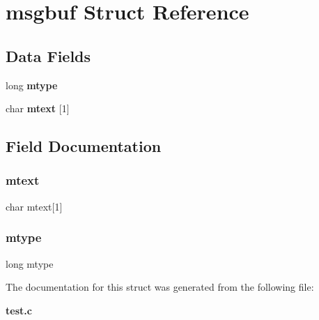 \section{msgbuf Struct Reference}
\label{structmsgbuf}
\subsection*{Data Fields}
\begin{DoxyCompactItemize}
\item 
long \textbf{ mtype}
\item 
char \textbf{ mtext} [1]
\end{DoxyCompactItemize}


\subsection{Field Documentation}
\mbox{\label{structmsgbuf_a25caee4909ab47dffbf18c639cb7f833}} 
\subsubsection{mtext}
{\footnotesize\ttfamily char mtext[1]}

\mbox{\label{structmsgbuf_a6e71692f0e74d6cd516fa62386afcfb4}} 
\subsubsection{mtype}
{\footnotesize\ttfamily long mtype}



The documentation for this struct was generated from the following file\+:\begin{DoxyCompactItemize}
\item 
\textbf{ test.\+c}\end{DoxyCompactItemize}
